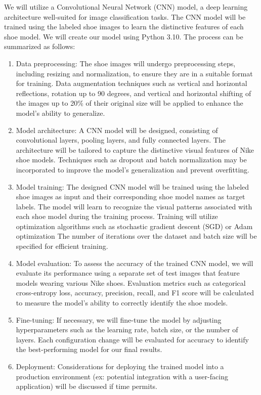 \documentclass{article}
\begin{document}
\begin{itemize}
		We will utilize a Convolutional Neural Network (CNN) model, a deep learning architecture well-suited for image classification tasks. The CNN model will be trained using the labeled shoe images to learn the distinctive features of each shoe model. We will create our model using Python 3.10. The process can be summarized as follows: 
		\begin{enumerate}
			\item Data preprocessing: The shoe images will undergo preprocessing steps, including resizing and normalization, to ensure they are in a suitable format for training. Data augmentation techniques such as vertical and horizontal reflections, rotation up to 90 degrees, and vertical and horizontal shifting of the images up to 20\% of their original size will be applied to enhance the model's ability to generalize. 
			\item Model architecture: A CNN model will be designed, consisting of convolutional layers, pooling layers, and fully connected layers. The architecture will be tailored to capture the distinctive visual features of Nike shoe models. Techniques such as dropout and batch normalization may be incorporated to improve the model's generalization and prevent overfitting. 
			\item Model training: The designed CNN model will be trained using the labeled shoe images as input and their corresponding shoe model names as target labels. The model will learn to recognize the visual patterns associated with each shoe model during the training process. Training will utilize optimization algorithms such as stochastic gradient descent (SGD) or Adam optimization The number of iterations over the dataset and batch size will be specified for efficient training.
			\item Model evaluation: To assess the accuracy of the trained CNN model, we will evaluate its performance using a separate set of test images that feature models wearing various Nike shoes. Evaluation metrics such as categorical cross-entropy loss, accuracy, precision, recall, and F1 score will be calculated to measure the model's ability to correctly identify the shoe models.
			\item Fine-tuning: If necessary, we will fine-tune the model by adjusting hyperparameters such as the learning rate, batch size, or the number of layers. Each configuration change will be evaluated for accuracy to identify the best-performing model for our final results. 
			\item Deployment: Considerations for deploying the trained model into a production environment (ex: potential integration with a user-facing application) will be discussed if time permits. 

\end{enumerate}
\end{itemize}
\end{document}
